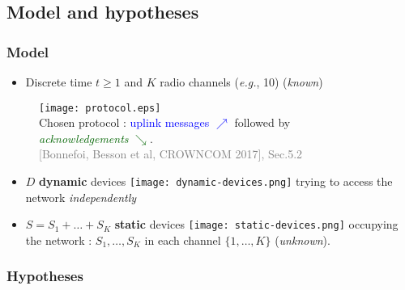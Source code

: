 \subsection{Model and hypotheses}

\subsubsection{Model}

\begin{frameO}[Model]

    \begin{itemize}
        \item
              Discrete time \(t\geq1\) and \(K\) radio channels (\emph{e.g.}, 10)
              \hfill{} (\emph{known})
    \end{itemize}

    \begin{figure}[h!]
        \centering
        \texttt{[image: protocol.eps]}\\
        
        {\small Chosen protocol : \textcolor{blue}{uplink messages {\large $\nearrow$}} followed by \textcolor{darkgreen}{\emph{acknowledgements} {\large $\searrow$}}.}\\
        \hfill{} {\tiny \textcolor{gray}{[Bonnefoi, Besson et al, CROWNCOM 2017], Sec.5.2}}
    \end{figure}

    \begin{itemize}
        \item
              \(D\) \textbf{dynamic} devices \texttt{[image: dynamic-devices.png]} trying to access the network \emph{independently}
        \item
              \(S=S_1+\dots+S_{K}\) \textbf{static} devices \texttt{[image: static-devices.png]} occupying the network :
              \newline
              \(S_1,\dots,S_{K}\) in each channel \(\{1,\dots,K\}\) \hfill{} (\emph{unknown}).
    \end{itemize}

\end{frameO}



\subsubsection{Hypotheses}

